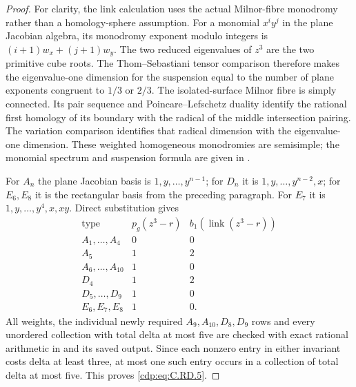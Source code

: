 \begin{proof}
For clarity, the link calculation uses the actual
Milnor-fibre monodromy rather than a homology-sphere
assumption. For a monomial $x^i y^j$ in the plane
Jacobian algebra, its monodromy exponent modulo
integers is $(i+1)w_x+(j+1)w_y$. The two reduced
eigenvalues of $z^3$ are the two primitive cube
roots. The Thom--Sebastiani tensor comparison
therefore makes the eigenvalue-one dimension for
the suspension equal to the number of plane
exponents congruent to $1/3$ or $2/3$.
The isolated-surface Milnor fibre is simply
connected. Its pair sequence and Poincare--Lefschetz
duality identify the rational first homology of
its boundary with the radical of the middle
intersection pairing. The variation comparison
identifies that radical dimension with the
eigenvalue-one dimension. These weighted homogeneous
monodromies are semisimple; the monomial spectrum
and suspension formula are given in
\cite[pp. 165--167]{Steenbrink1989Spectrum}.

For $A_n$ the plane Jacobian basis is
$1,y,\ldots,y^{n-1}$; for $D_n$ it is
$1,y,\ldots,y^{n-2},x$; for $E_6,E_8$ it is the
rectangular basis from the preceding paragraph.
For $E_7$ it is $1,y,\ldots,y^4,x,xy$.
Direct substitution gives
\[
\begin{array}{c|c|c}
 \text{type}&p_g(z^3-r)&b_1(\operatorname{link}(z^3-r))\\\hline
 A_1,\ldots,A_4&0&0\\
 A_5&1&2\\
 A_6,\ldots,A_{10}&1&0\\
 D_4&1&2\\
 D_5,\ldots,D_9&1&0\\
 E_6,E_7,E_8&1&0.
\end{array}
\tag{C.RD.10}\label{cdp:eq:C.RD.10}
\]
All weights, the individual newly required
$A_9,A_{10},D_8,D_9$ rows and every unordered
collection with total delta at most five are
checked with exact rational arithmetic in
 and its saved output.
Since each nonzero entry in either invariant
costs delta at least three, at most one such
entry occurs in a collection of total delta
at most five. This proves \eqref{cdp:eq:C.RD.5}.
\end{proof}


